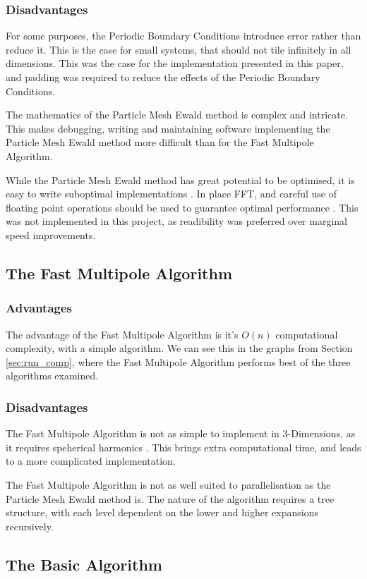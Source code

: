 \documentclass[pdftex,twoside,a4paper]{report}
\newcommand{\pmem}{Particle Mesh Ewald method}
\newcommand{\fma}{Fast Multipole Algorithm}
\begin{document}
\subsubsection{Disadvantages}
For some purposes, the Periodic Boundary Conditions introduce error rather than reduce it. This is the case for small systems, that should not tile infinitely in all dimensions. This was the case for the implementation presented in this paper, and padding was required to reduce the effects of the Periodic Boundary Conditions.

The mathematics of the \pmem{} is complex and intricate. This makes debugging, writing and maintaining software implementing the \pmem{} more difficult than for the \fma{}. 

While the \pmem{} has great potential to be optimised, it is easy to write suboptimal implementations \cite{toukmaji:73}. In place FFT, and careful use of floating point operations should be used to guarantee optimal performance \cite{lee05}. This was not implemented in this project, as readibility was preferred over marginal speed improvements.

\subsection{The \fma{}}
\subsubsection{Advantages}
The advantage of the \fma{} is it's $O(n)$ computational complexity, with a simple algorithm. We can see this in the graphs from Section \ref{sec:run_comp}, where the \fma{} performs best of the three algorithms examined.

\subsubsection{Disadvantages}
The \fma{} is not as simple to implement in 3-Dimensions, as it requires speherical harmonics \cite{spherical}. This brings extra computational time, and leads to a more complicated implementation.

The \fma{} is not as well suited to parallelisation as the \pmem{} is. The nature of the algorithm requires a tree structure, with each level dependent on the lower and higher expansions recursively.

\subsection{The Basic Algorithm}
\end{document}
